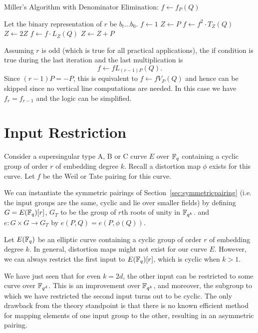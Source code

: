 \begin{algorithm}
\caption {Miller's Algorithm with Denominator Elimination: $f \gets f_P(Q)$}
\begin{algorithmic}[1]
\STATE Let the binary representation of $r$ be $b_t ... b_0$.
\STATE $f \gets 1$
\STATE $Z \gets P$
    \STATE $f \gets f^2 \cdot T_Z(Q)$
    \STATE $Z \gets 2Z$
	\STATE $f \gets f \cdot L_Z(Q)$
	\STATE $Z \gets Z + P$
    \ENDIF
\ENDFOR
\end{algorithmic}
\end{algorithm}

Assuming $r$ is odd (which is true for all practical applications),
the if condition is true during the last iteration and
the last multiplication is
\[ f \leftarrow f L_{(r-1)P}(Q) .\]
Since $(r-1)P = -P$, this is equivalent to $f \leftarrow f V_P(Q)$
and hence can be skipped since no vertical line computations are needed.
In this case we have $f_r = f_{r-1}$ and the logic can be simplified.

\section {\label{sec:inputrestriction}Input Restriction}

Consider a supersingular type A, B or C curve $E$ over $\mathbb{F}_q$ containing
a cyclic group of order $r$ of embedding degree $k$. Recall
a distortion map $\phi$ exists for this curve.
Let $f$ be the Weil or Tate pairing for this
curve.

We can instantiate the symmetric pairings of Section~\ref{sec:symmetricpairing}
(i.e. the input groups are the same, cyclic and lie over smaller fields)
by defining $G = E(\mathbb{F}_q)[r]$,
$G_T$ to be the group of $r$th roots of unity in $\mathbb{F}_{q^k}$.
and $e : G \times G \rightarrow G_T$ by
$e(P,Q) = e(P, \phi(Q))$.

Let $E(\mathbb{F}_q)$ be an elliptic curve containing a cyclic
group of order $r$ of embedding degree $k$.
In general, distortion maps might not exist for our curve $E$.
However, we can always restrict the first input to $E(\mathbb{F}_q)[r]$,
which is cyclic when $k > 1$.

We have just seen that for even $k = 2d$,
the other input can be restricted to some curve over $\mathbb{F}_{q^d}$.
This is an improvement over $\mathbb{F}_{q^k}$, and moreover, the
subgroup to which we have restricted the second input turns out to be cyclic.
The only drawback from the theory standpoint
is that there is no known efficient method
for mapping elements of one input group to the other, resulting in an
asymmetric pairing.

